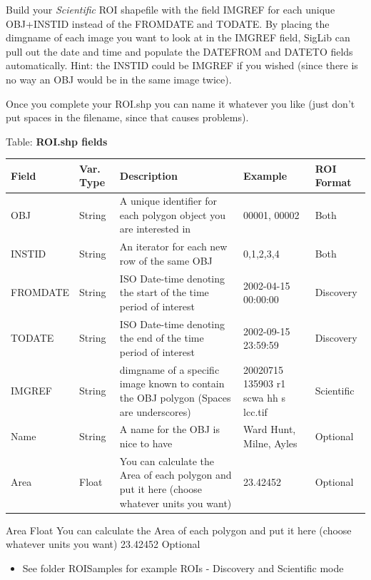 \documentclass[letterpaper,10pt,openany,oneside]{sphinxmanual}
\begin{document}
Build your \emph{Scientific} ROI shapefile with the field IMGREF for each
unique OBJ+INSTID instead of the FROMDATE and TODATE. By placing the
dimgname of each image you want to look at in the IMGREF field, SigLib
can pull out the date and time and populate the DATEFROM and DATETO
fields automatically. Hint: the INSTID could be IMGREF if you wished
(since there is no way an OBJ would be in the same image twice).

Once you complete your ROI.shp you can name it whatever you like (just
don't put spaces in the filename, since that causes problems).

Table: \textbf{ROI.shp fields}

\begin{tabulary}{\linewidth}{|L|L|L|L|L|}
\hline
\textsf{\relax 
Field
} & \textsf{\relax 
Var. Type
} & \textsf{\relax 
Description
} & \textsf{\relax 
Example
} & \textsf{\relax 
ROI Format
}\\
\hline
OBJ
 & 
String
 & 
A unique identifier for each polygon object you are interested in
 & 
00001, 00002
 & 
Both
\\
\hline
INSTID
 & 
String
 & 
An iterator for each new row of the same OBJ
 & 
0,1,2,3,4
 & 
Both
\\
\hline
FROMDATE
 & 
String
 & 
ISO Date-time denoting the start of the time period of interest
 & 
2002-04-15 00:00:00
 & 
Discovery
\\
\hline
TODATE
 & 
String
 & 
ISO Date-time denoting the end of the time period of interest
 & 
2002-09-15 23:59:59
 & 
Discovery
\\
\hline
IMGREF
 & 
String
 & 
dimgname of a specific image known to contain the OBJ polygon (Spaces are underscores)
 & 
20020715 135903 r1 scwa  hh s lcc.tif
 & 
Scientific
\\
\hline
Name
 & 
String
 & 
A name for the OBJ is nice to have
 & 
Ward Hunt, Milne, Ayles
 & 
Optional
\\
\hline
Area
 & 
Float
 & 
You can calculate the Area of each polygon and put it here (choose whatever units you want)
 & 
23.42452
 & 
Optional
\\
\hline\end{tabulary}


\begin{DUlineblock}{0em}
\item[] Area       \textbar{} Float      \textbar{} You can calculate the Area of each polygon and put it here (choose whatever units you want)           \textbar{} 23.42452                                       \textbar{} Optional     \textbar{}
\end{DUlineblock}
\begin{itemize}
\item {} 
See folder ROISamples for example ROIs - Discovery and Scientific
mode

\end{itemize}
\end{document}
